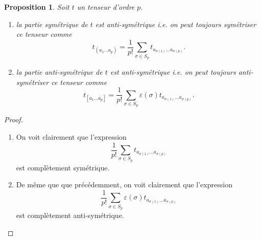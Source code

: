 \documentclass[a4paper,11pt]{report}
\theoremstyle{definition}
\theoremstyle{plain}
\newtheorem{prop}[thm]{Proposition}
\theoremstyle{definition}
\theoremstyle{remark}
\begin{document}
                \begin{prop}
                    Soit $t$ un tenseur d'ordre $p$.
                    \begin{enumerate}[label = \textit{\roman*)}]
                        \item la partie symétrique de $t$ est anti-symétrique i.e. on peut toujours symétriser ce tenseur comme
                        \begin{equation}
                            t_{(a_1\dots a_p)} = \frac{1}{p!} \sum_{\sigma\in S_p} t_{a_{\sigma(1)}\dots a_{\sigma(p)}}.
                        \end{equation}
                        \item la partie anti-symétrique de $t$ est anti-symétrique i.e. on peut toujours anti-symétriser ce tenseur comme
                        \begin{equation}
                            t_{[a_1\dots a_p]} = \frac{1}{p!} \sum_{\sigma\in S_p}\varepsilon(\sigma) t_{a_{\sigma(1)}\dots a_{\sigma(p)}}.
                        \end{equation}
                    \end{enumerate}
                \end{prop}
                
                \begin{proof}${}$
                    \begin{enumerate}[label = \textit{\roman*)}]
                        \item On voit clairement que l'expression
                        \begin{equation}
                            \frac{1}{p!} \sum_{\sigma\in S_p} t_{a_{\sigma(1)}\dots a_{\sigma(p)}}
                        \end{equation}
                        est complètement symétrique.
                        \item De même que que précédemment, on voit clairement que l'expression
                        \begin{equation}
                            \frac{1}{p!} \sum_{\sigma\in S_p}\varepsilon(\sigma) t_{a_{\sigma(1)}\dots a_{\sigma(p)}}
                        \end{equation}
                        est complètement anti-symétrique.
                    \end{enumerate}
                \end{proof}
                
\end{document}
